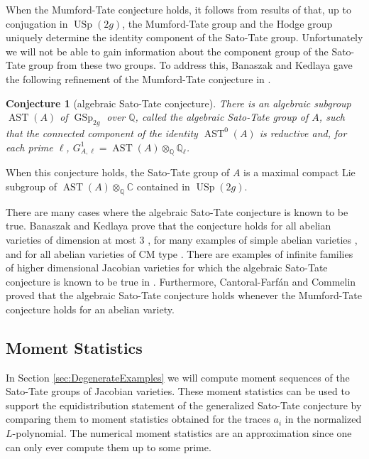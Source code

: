 \documentclass[reqno, oneside, 12pt]{amsart}
\DeclareMathOperator{\USp}{USp}
\DeclareMathOperator{\GSp}{GSp}
\DeclareMathOperator{\AST}{AST}
\newtheorem{conjecture}[theorem]{Conjecture}
\theoremstyle{remark}
\numberwithin{equation}{section}
\begin{document}
When the Mumford-Tate conjecture holds, it follows from results of \cite[Section 3]{Banaszak2015} that, up to conjugation in $\USp(2g)$, the Mumford-Tate group and the Hodge group uniquely determine the identity component of the Sato-Tate group. Unfortunately we will not be able to gain information about the component group of the Sato-Tate group from these two groups. To address this, Banaszak and Kedlaya gave the following refinement of the Mumford-Tate conjecture in \cite{Banaszak2015}.

\begin{conjecture}[algebraic Sato-Tate conjecture]\label{conjec:AST}  There is an algebraic subgroup $\AST(A)$ of $\GSp_{2g}$ over $\mathbb Q$, called the {algebraic Sato-Tate group of $A$}, such that the connected component of the identity $\AST^0(A)$ is reductive and, for each prime $\ell$, $G^{1}_{A,\ell}=\AST(A)\otimes_{\mathbb Q} \mathbb Q_{\ell}$.
\end{conjecture}

When this conjecture holds, the {Sato-Tate group} of $A$ is a maximal compact Lie subgroup of $\AST(A)\otimes_\mathbb{Q} \mathbb{C}$ contained in $\USp(2g)$. 

There are many cases where the algebraic Sato-Tate conjecture is known to be true.  Banaszak and Kedlaya prove that the conjecture holds for all abelian varieties of dimension at most 3 \cite[Theorem 6.11]{Banaszak2015}, for many examples of simple abelian varieties  \cite[Theorem 6.9]{Banaszak2015}, and for all abelian varieties of CM type  \cite[Theorem 6.6]{Banaszak2015}.  There are examples of infinite families of higher dimensional Jacobian varieties for which the algebraic Sato-Tate conjecture is known to be true in \cite{EmoryGoodson2020, FS2016, GoodsonCatalan}. Furthermore, Cantoral-Farf\'an and Commelin \cite{CantoralCommelin2022} proved that the algebraic Sato-Tate conjecture holds whenever the Mumford-Tate conjecture holds for an abelian variety.

\subsection{Moment Statistics}
In Section \ref{sec:DegenerateExamples} we will compute moment sequences of the Sato-Tate groups of  Jacobian varieties. These moment statistics can be used to support the equidistribution statement of the generalized Sato-Tate conjecture by comparing them to moment statistics obtained for the traces $a_i$ in the normalized $L$-polynomial. The numerical moment statistics are an approximation since one can only ever compute them up to some prime.
\end{document}
